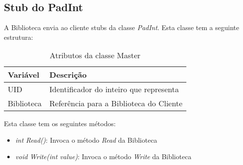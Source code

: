 \subsection{Stub do PadInt}

A Biblioteca envia ao cliente stubs da classe \textit{PadInt}. Esta classe tem a seguinte estrutura:

\begin{table}[H]
\centering
\begin{tabular}{| p{2cm} | p{} |}
\hline
\textbf{Variável} & \textbf{Descrição} \\
\hline
UID & Identificador do inteiro que representa \\
\hline
Biblioteca & Referência para a Biblioteca do Cliente \\
\hline
\end{tabular}
\caption{Atributos da classe Master}
\end{table}

Esta classe tem os seguintes métodos:

\begin{itemize}
	\item \textit{int Read()}: Invoca o método \textit{Read} da Biblioteca
	\item \textit{void Write(int value)}: Invoca o método \textit{Write} da Biblioteca
\end{itemize}